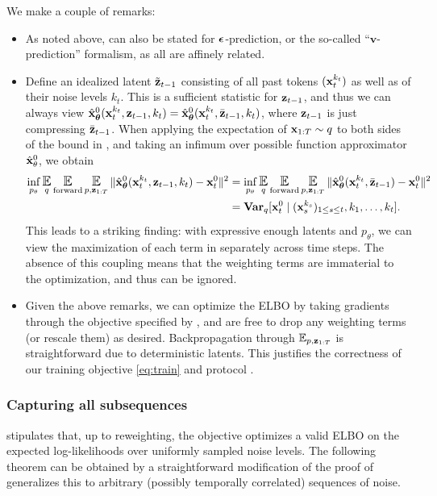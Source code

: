 We make a couple of remarks:
\begin{itemize}
    \item As noted above,  can also be stated for $\bm{\epsilon}$-prediction, or the so-called ``$\mathbf{v}$-prediction'' formalism, as all are affinely related. 
    \item Define an idealized latent $\tilde{\mathbf{z}}_{t-1}$ consisting of all past tokens $(\mathbf{x}_t^{k_t})$ as well as of their noise levels $k_t$. This is a sufficient statistic for $\mathbf{z}_{t-1}$, and thus we can always view $\hat{\mathbf{x}}^0_{\bm{\theta}}(\mathbf{x}_{t}^{k_t},\mathbf{z}_{t-1},{k_t}) = \hat{\mathbf{x}}^0_{\bm{\theta}}(\mathbf{x}_{t}^{k_t},\bar{\mathbf{z}}_{t-1},{k_t}) $, where $\mathbf{z}_{t-1}$ is just compressing $\bar {\mathbf{z}}_{t-1}$.  When applying the expectation of $\mathbf{x}_{1:T} \sim q$ to both sides of the bound in , and taking an infimum over possible function approximator $\hat{\mathbf{x}}^0_{\theta}$, we obtain
    \begin{align*}
        \inf_{p_\theta} \Exp_{q}\Eforward \Epz \| \hat{\bx}^0_{\bm{\theta}}(\bx_{t}^{k_t},\bz_{t-1},{k_t}) - \bx_t^0\|^2 &= \inf_{p_\theta} \Exp_{q}\Eforward \Epz \| \hat{\bx}^0_{\bm{\theta}}(\bx_{t}^{k_t},\bar{\bz}_{t-1}) - \bx_t^0\|^2 \\
        &= \mathbf{Var}_{q}[\bx_t^0 \mid (\bx_s^{k_s})_{1 \le s \le t}, k_1,\dots,k_t ]. 
    \end{align*}
    This leads to a striking finding: with expressive enough latents and $p_{\theta}$, we can view the maximization of each term in  separately across time steps. The absence of this coupling means that the weighting terms are immaterial to the optimization, and thus can be ignored. 
    \item Given the above remarks, we can optimize the ELBO by taking gradients through the objective specified by , and are free to drop any weighting terms (or rescale them) as desired. Backpropagation through $\Epz$ is straightforward due to deterministic latents. This justifies the correctness of our training objective  \eqref{eq:train} and protocol .
\end{itemize}



\subsubsection{Capturing all subsequences}
 stipulates that, up to reweighting, the \algo{} objective optimizes a valid ELBO on the expected log-likelihoods over uniformly sampled noise levels.  The following theorem can be obtained by a straightforward modification of the proof of  generalizes this to arbitrary (possibly temporally correlated) sequences of noise. 




